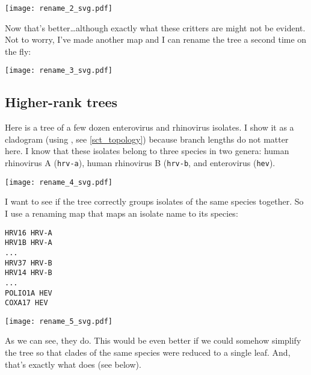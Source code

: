 
\begin{center}
\texttt{[image: rename\_2\_svg.pdf]}
\end{center}

\noindent{}Now that's better\ldots although exactly what these critters are
might not be evident. Not to worry, I've made another map and I can rename the
tree a second time on the fly:


\begin{center}
\texttt{[image: rename\_3\_svg.pdf]}
\end{center}

\subsection{Higher-rank trees}
\label{sct_higher_rank}

Here is a tree of a few dozen enterovirus and rhinovirus isolates. I show it as
a cladogram (using \topology, see \ref{sct_topology}) because branch lengths do
not matter here. I know that these isolates belong to three species in two
genera: human rhinovirus A (\texttt{hrv-a}), human rhinovirus B
(\texttt{hrv-b}, and enterovirus (\texttt{hev}). 


\begin{center}
\texttt{[image: rename\_4\_svg.pdf]}
\end{center}

\noindent{}I want to see if the tree correctly groups isolates of the same
species together. So I use a renaming map that maps an isolate name to its
species:
\begin{verbatim}
HRV16 HRV-A
HRV1B HRV-A
...
HRV37 HRV-B
HRV14 HRV-B
...
POLIO1A HEV
COXA17 HEV
\end{verbatim}


\begin{center}
\texttt{[image: rename\_5\_svg.pdf]}
\end{center}

As we can see, they do. This would be even better if we could somehow simplify
the tree so that clades of the same species were reduced to a single leaf. And,
that's exactly what \condense{} does (see below).
